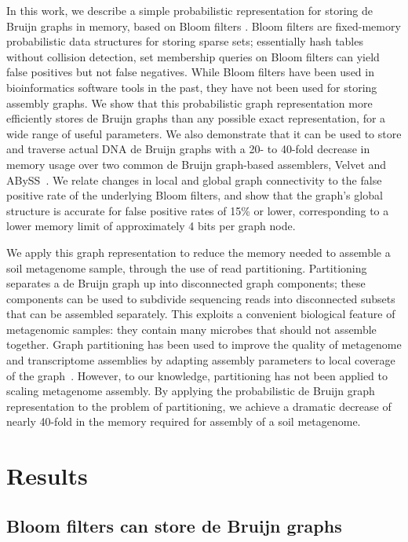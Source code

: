 \documentclass[draft]{pnastwo}
\begin{document}
\begin{article}
In this work, we describe a simple probabilistic representation for
storing de Bruijn graphs in memory, based on Bloom filters
\cite{bloom}.  Bloom filters are fixed-memory probabilistic data
structures for storing sparse sets; essentially hash tables without
collision detection, set membership queries on Bloom filters can yield
false positives but not false negatives. While Bloom filters have been used
in bioinformatics software tools in the past, they have not been used
for storing assembly
graphs\cite{bloomref1,bloomref2,bloomref3,bloomref4}. We show that
this probabilistic graph representation more efficiently stores de
Bruijn graphs than any possible exact representation, for a wide range
of useful parameters.  We also demonstrate that it can be used to
store and traverse actual DNA de Bruijn graphs with a 20- to 40-fold
decrease in memory usage over two common de Bruijn graph-based
assemblers, Velvet and ABySS~\cite{velvet,abyss}. We relate changes in
local and global graph connectivity to the false positive rate of the
underlying Bloom filters, and show that the graph's global structure
is accurate for false positive rates of 15\% or lower, corresponding
to a lower memory limit of approximately 4 bits per graph node.

We apply this graph representation to reduce the memory needed to
assemble a soil metagenome sample, through the use of read
partitioning.  Partitioning separates a de Bruijn graph up into
disconnected graph components; these components can be used to
subdivide sequencing reads into disconnected subsets that can be
assembled separately.  This exploits a convenient biological feature
of metagenomic samples: they contain many microbes that should not
assemble together.  Graph partitioning has been used to improve the
quality of metagenome and transcriptome assemblies by adapting
assembly parameters to local coverage of the
graph~\cite{metavelvet,pubmed21685107,trinity}.  However, to our
knowledge, partitioning has not been applied to scaling metagenome
assembly. By applying the probabilistic de Bruijn graph representation
to the problem of partitioning, we achieve a dramatic decrease of
nearly 40-fold in the memory required for assembly of a soil
metagenome.


\section{Results}

\subsection{Bloom filters can store de Bruijn graphs}


\end{article}
\end{document}
